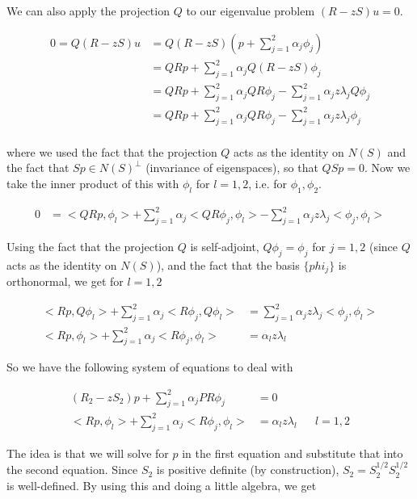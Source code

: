 \documentclass[12pt]{article}
\begin{document}
We can also apply the projection $Q$ to our eigenvalue problem $(R - zS)u = 0$.

\begin{align}
0 = Q(R - zS)u &= Q(R - zS)(p + \sum_{j=1}^2 \alpha_j \phi_j) \\
&= QRp + \sum_{j=1}^2 \alpha_j Q(R - zS) \phi_j \\
&= QRp + \sum_{j=1}^2 \alpha_j Q R \phi_j - \sum_{j=1}^2 \alpha_j z \lambda_j Q \phi_j \\
&= QRp + \sum_{j=1}^2 \alpha_j Q R \phi_j - \sum_{j=1}^2 \alpha_j z \lambda_j \phi_j \\
\end{align}

where we used the fact that the projection $Q$ acts as the identity on $N(S)$ and the fact that $Sp \in N(S)^\perp$ (invariance of eigenspaces), so that $QSp = 0$. Now we take the inner product of this with $\phi_l$ for $l = 1, 2$, i.e. for $\phi_1, \phi_2$.

\begin{align}
0 &= <QRp, \phi_l> + \sum_{j=1}^2 \alpha_j <Q R \phi_j, \phi_l> - \sum_{j=1}^2 \alpha_j z \lambda_j <\phi_j, \phi_l>
\end{align}

Using the fact that the projection $Q$ is self-adjoint, $Q \phi_j = \phi_j$ for $j = 1, 2$ (since $Q$ acts as the identity on $N(S)$), and the fact that the basis $\{phi_j\}$ is orthonormal, we get for $l = 1, 2$

\begin{align}
<Rp, Q\phi_l> + \sum_{j=1}^2 \alpha_j <R \phi_j, Q\phi_l> &= \sum_{j=1}^2 \alpha_j z \lambda_j <\phi_j, \phi_l> \\
<Rp, \phi_l> + \sum_{j=1}^2 \alpha_j <R \phi_j, \phi_l> &= \alpha_l z \lambda_l
\end{align}

So we have the following system of equations to deal with

\begin{align}\label{system}
(R_2 - z S_2)p + \sum_{j=1}^2 \alpha_j P R \phi_j &= 0 \\
<Rp, \phi_l> + \sum_{j=1}^2 \alpha_j <R \phi_j, \phi_l> &= \alpha_l z \lambda_l && l = 1, 2
\end{align}

The idea is that we will solve for $p$ in the first equation and substitute that into the second equation. Since $S_2$ is positive definite (by construction), $S_2 = S_2^{1/2} S_2^{1/2}$ is well-defined. By using this and doing a little algebra, we get
\end{document}
